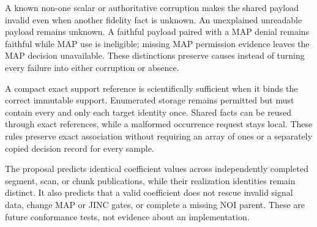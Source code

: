 A known non-one scalar or authoritative corruption makes the shared payload
invalid even when another fidelity fact is unknown. An unexplained unreadable
payload remains unknown. A faithful payload paired with a MAP denial remains
faithful while MAP use is ineligible; missing MAP permission evidence leaves
the MAP decision unavailable. These distinctions preserve causes instead of
turning every failure into either corruption or absence.

A compact exact support reference is scientifically sufficient when it binds
the correct immutable support. Enumerated storage remains permitted but must
contain every and only each target identity once. Shared facts can be reused
through exact references, while a malformed occurrence request stays local.
These rules preserve exact association without requiring an array of ones or
a separately copied decision record for every sample.

The proposal predicts identical coefficient values across independently
completed segment, scan, or chunk publications, while their realization
identities remain distinct. It also predicts that a valid coefficient does
not rescue invalid signal data, change MAP or JINC gates, or complete a
missing NOI parent. These are future conformance tests, not evidence about an
implementation.

\fi
